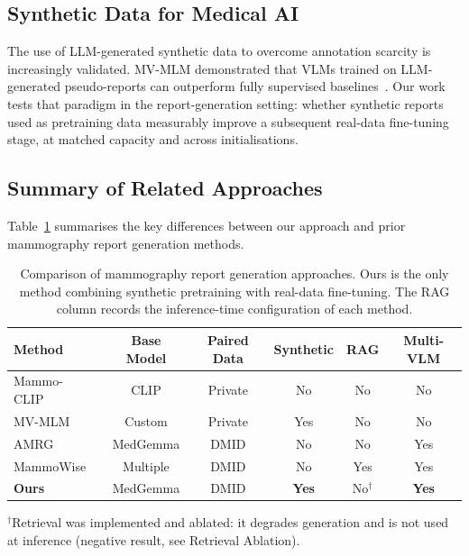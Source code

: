 \documentclass{wlscirep}
\begin{document}
\subsection*{Synthetic Data for Medical AI}

The use of LLM-generated synthetic data to overcome annotation scarcity is increasingly validated. MV-MLM demonstrated that VLMs trained on LLM-generated pseudo-reports can outperform fully supervised baselines~\cite{ahmed2025}. Our work tests that paradigm in the report-generation setting: whether synthetic reports used as pretraining data measurably improve a subsequent real-data fine-tuning stage, at matched capacity and across initialisations.

\subsection*{Summary of Related Approaches}

Table~\ref{tab:related} summarises the key differences between our approach and prior mammography report generation methods.

\begin{table}[H]
\centering
\caption{Comparison of mammography report generation approaches. Ours is the only method combining synthetic pretraining with real-data fine-tuning. The RAG column records the inference-time configuration of each method.}
\label{tab:related}
\small
\begin{tabular}{lccccc}
\toprule
\textbf{Method} & \textbf{Base Model} & \textbf{Paired Data} & \textbf{Synthetic} & \textbf{RAG} & \textbf{Multi-VLM} \\
\midrule
Mammo-CLIP~\cite{ghosh2024} & CLIP & Private & No & No & No \\
MV-MLM~\cite{ahmed2025} & Custom & Private & Yes & No & No \\
AMRG~\cite{sung2025} & MedGemma & DMID & No & No & Yes \\
MammoWise~\cite{jahangir2026}& Multiple & DMID & No & Yes & Yes \\
\textbf{Ours} & MedGemma & DMID & \textbf{Yes} & No$^{\dagger}$ & \textbf{Yes} \\
\bottomrule
\end{tabular}

\footnotesize $^{\dagger}$Retrieval was implemented and ablated: it degrades generation and is not used at inference (negative result, see Retrieval Ablation).
\end{table}
\end{document}
